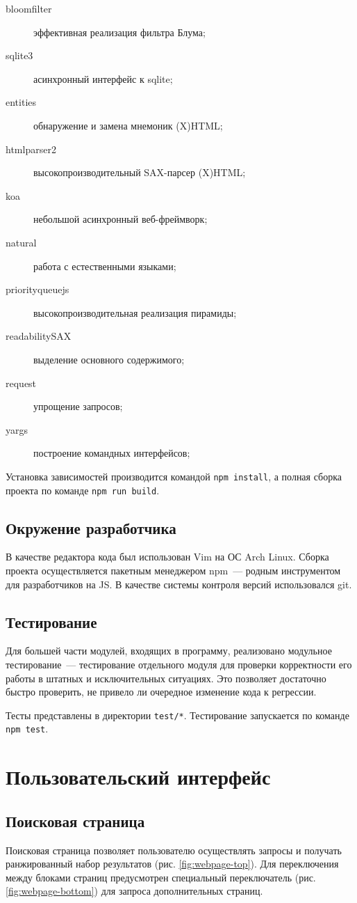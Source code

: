 \begin{description}
  \item[bloomfilter] эффективная реализация фильтра Блума;
  \item[sqlite3] асинхронный интерфейс к sqlite;
  \item[entities] обнаружение и замена мнемоник (X)HTML;
  \item[htmlparser2] высокопроизводительный SAX-парсер (X)HTML;
  \item[koa] небольшой асинхронный веб-фреймворк;
  \item[natural] работа с естественными языками;
  \item[priorityqueuejs] высокопроизводительная реализация пирамиды;
  \item[readabilitySAX] выделение основного содержимого;
  \item[request] упрощение запросов;
  \item[yargs] построение командных интерфейсов;
\end{description}

Установка зависимостей производится командой \verb|npm install|, а полная сборка проекта по команде \verb|npm run build|.


\subsection*{Окружение разработчика}
В качестве редактора кода был использован Vim на ОС Arch Linux. Сборка проекта осуществляется пакетным менеджером npm~--- родным инструментом для разработчиков на JS. В качестве системы контроля версий использовался git.


\subsection*{Тестирование}
Для большей части модулей, входящих в программу, реализовано модульное тестирование~--- тестирование отдельного модуля для проверки корректности его работы в штатных и исключительных ситуациях. Это позволяет достаточно быстро проверить, не привело ли очередное изменение кода к регрессии.

Тесты представлены в директории \verb|test/*|. Тестирование запускается по команде \verb|npm test|.


\section{Пользовательский интерфейс}
\subsection*{Поисковая страница}
Поисковая страница позволяет пользователю осуществлять запросы и получать ранжированный набор результатов (рис. \ref{fig:webpage-top}). Для переключения между блоками страниц предусмотрен специальный переключатель (рис. \ref{fig:webpage-bottom}) для запроса дополнительных страниц.

